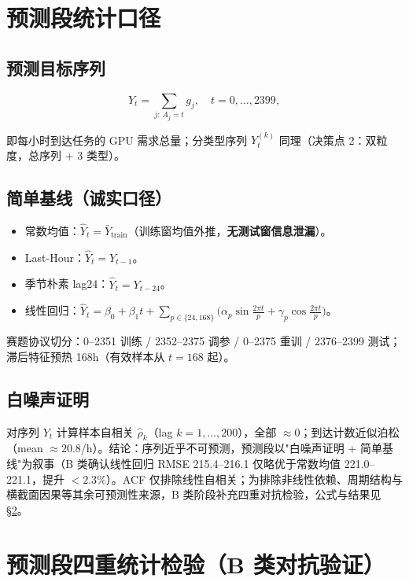 \documentclass{internal-report}
\begin{document}
\section{预测段统计口径}

\subsection{预测目标序列}

\begin{equation}
  Y_t = \sum_{j:\, A_j = t} g_j,\quad t = 0,\ldots,2399,
  \label{eq:yseq}
\end{equation}

即每小时到达任务的 GPU 需求总量；分类型序列 $Y_t^{(k)}$ 同理（决策点 2：双粒度，总序列 + 3 类型）。

\subsection{简单基线（诚实口径）}

\begin{itemize}
  \item 常数均值：$\hat{Y}_t = \bar{Y}_{\text{train}}$（训练窗均值外推，\textbf{无测试窗信息泄漏}）。
  \item Last-Hour：$\hat{Y}_t = Y_{t-1}$。
  \item 季节朴素 lag24：$\hat{Y}_t = Y_{t-24}$。
  \item 线性回归：$\hat{Y}_t = \beta_0 + \beta_1 t + \sum_{p \in \{24,168\}} \big(\alpha_p \sin\frac{2\pi t}{p} + \gamma_p \cos\frac{2\pi t}{p}\big)$。
\end{itemize}

赛题协议切分：0--2351 训练 / 2352--2375 调参 / 0--2375 重训 / 2376--2399 测试；滞后特征预热 168h（有效样本从 $t=168$ 起）。

\subsection{白噪声证明}

对序列 $Y_t$ 计算样本自相关 $\hat{\rho}_k$（lag $k=1,\ldots,200$），全部 $\approx 0$；到达计数近似泊松（mean $\approx 20.8$/h）。结论：序列近乎不可预测，预测段以"白噪声证明 + 简单基线"为叙事（B 类确认线性回归 RMSE 215.4--216.1 仅略优于常数均值 221.0--221.1，提升 $<2.3\%$）。ACF 仅排除线性自相关；为排除非线性依赖、周期结构与横截面因果等其余可预测性来源，B 类阶段补充四重对抗检验，公式与结果见 \S\ref{sec:whitenoise-proof}。

\section{预测段四重统计检验（B 类对抗验证）}
\label{sec:whitenoise-proof}
\end{document}

